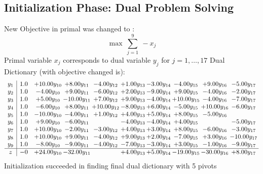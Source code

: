 \documentclass[9pt]{article}
\begin{document}
\subsection{Initialization Phase: Dual Problem Solving}
New Objective in primal was changed to : \[ \max\ \sum_{j=1}^{9}\ - x_j \] 
Primal variable $x_j$ corresponds to dual variable $y_j$ for $j = 1,\ldots,17$
Dual Dictionary (with objective changed is): 
\[\begin{array}{c| c c@{\hskip 2pt} c@{\hskip 2pt} c@{\hskip 2pt} c@{\hskip 2pt} c@{\hskip 2pt} c@{\hskip 2pt} c@{\hskip 2pt} c@{\hskip 2pt} }
 y_{1}   &  1.0 & + 10.00 y_{10} & +  8.00 y_{11} & -4.00 y_{12} & +  1.00 y_{13} & -3.00 y_{14} & -4.00 y_{15} & +  9.00 y_{16} & -5.00 y_{17}\\
 y_{2}   &  1.0 & -4.00 y_{10} & +  9.00 y_{11} & -6.00 y_{12} & +  2.00 y_{13} & -9.00 y_{14} & +  9.00 y_{15} & -4.00 y_{16} & -2.00 y_{17}\\
 y_{3}   &  1.0 & +  5.00 y_{10} & -10.00 y_{11} & +  7.00 y_{12} & +  9.00 y_{13} & -4.00 y_{14} & + 10.00 y_{15} & -4.00 y_{16} & -7.00 y_{17}\\
 y_{4}   &  1.0 & -6.00 y_{10} & +  8.00 y_{11} & + 10.00 y_{12} & -8.00 y_{13} & +  6.00 y_{14} & -5.00 y_{15} & + 10.00 y_{16} & -6.00 y_{17}\\
 y_{5}   &  1.0 & -10.00 y_{10} & -4.00 y_{11} & +  1.00 y_{12} & +  4.00 y_{13} & +  5.00 y_{14} & +  8.00 y_{15} & -5.00 y_{16} &   \\
 y_{6}   &  1.0 & +  9.00 y_{10} & -6.00 y_{11} &   & -4.00 y_{13} & -4.00 y_{14} & +  4.00 y_{15} &   & -5.00 y_{17}\\
 y_{7}   &  1.0 & + 10.00 y_{10} & -2.00 y_{11} & -3.00 y_{12} & +  4.00 y_{13} & +  3.00 y_{14} & +  8.00 y_{15} & -6.00 y_{16} & -3.00 y_{17}\\
 y_{8}   &  1.0 & + 10.00 y_{10} & +  9.00 y_{11} & -4.00 y_{12} & +  9.00 y_{13} & +  2.00 y_{14} & -7.00 y_{15} & +  3.00 y_{16} & -10.00 y_{17}\\
 y_{9}   &  1.0 & -8.00 y_{10} & -9.00 y_{11} & -4.00 y_{12} & -7.00 y_{13} & -3.00 y_{14} & +  3.00 y_{15} & -1.00 y_{16} & -9.00 y_{17}\\
\hline
z    &  -0 & + 24.00 y_{10} & -32.00 y_{11} &   & +  4.00 y_{13} & +  5.00 y_{14} & -19.00 y_{15} & -30.00 y_{16} & +  8.00 y_{17}\\
\end{array}\]
Initialization succeeded in finding final dual dictionary with 5 pivots
\end{document}
